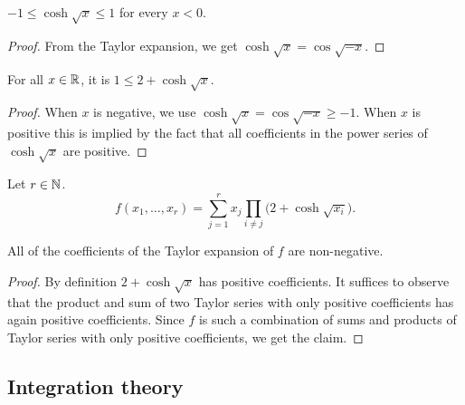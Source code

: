 \begin{lemma}
  \label{lem:coshsqrt-bd-neg}
  \leanok
  \(-1 \le \cosh \sqrt{x} \le 1\) for every \(x < 0\).
\end{lemma}
%
\begin{proof}
  From the Taylor expansion, we get \(\cosh \sqrt{x} = \cos \sqrt{-x}\).
\end{proof}

\begin{lemma}
  \label{lem:le-coshsqrt} %
  \leanok
  For all \(x \in \mathbb{R}\), it is \(1 \le 2 + \cosh\sqrt{x}\).
\end{lemma}
%
\begin{proof}
  When \(x\) is negative, we use \(\cosh \sqrt{x} = \cos \sqrt{-x}\ge -1\). When \(x\) is positive this is implied by the fact that all coefficients in the power series of \(\cosh \sqrt{x}\) are positive.
\end{proof}

\begin{definition}
  \label{def:f}
  \leanok
  Let \(r \in \mathbb{N}\).
  \begin{equation}\label{eq:f}
    f(x_1,\dots,x_r) = \sum_{j = 1}^r x_j \prod_{i \ne j} \big( 2 + \cosh\sqrt{x_i} \big).
  \end{equation}
\end{definition}

\begin{lemma}
  \label{lem:taylor-nonneg}
  All of the coefficients of the Taylor expansion of \(f\) are non-negative.
\end{lemma}
%
\begin{proof}
  By definition \(2+\cosh\sqrt{x}\) has positive coefficients. It suffices to observe that the product and sum of two Taylor series with only positive coefficients has again positive coefficients. Since \(f\) is such a combination of sums and products of Taylor series with only positive coefficients, we get the claim.
\end{proof}


\subsection{Integration theory}

